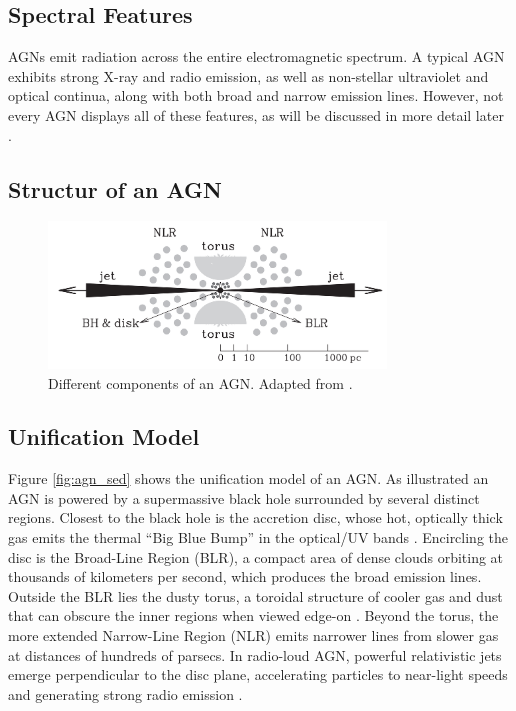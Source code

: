 \subsection{Spectral Features}

AGNs emit radiation across the entire electromagnetic spectrum. A typical AGN exhibits strong X-ray and radio emission, as well as non-stellar ultraviolet and optical continua, along with both broad and narrow emission lines. However, not every AGN displays all of these features, as will be discussed in more detail later \parencite{peterson1997introduction}.

\subsection{Structur of an AGN}

\begin{figure}[!ht]
	\centering
	\includegraphics[width=0.8\textwidth]{pictures/Chapter2/AGN_standard_paradigm.png}
	\caption{Different components of an AGN. Adapted from \textcite{mo2010galaxy}.}
	\label{fig:agn_structure_mo}
\end{figure}


\subsection{Unification Model}
Figure \ref{fig:agn_sed} shows the unification model of an AGN. 
As illustrated an AGN is powered by a supermassive black hole surrounded by several distinct regions. Closest to the black hole is the accretion disc, whose hot, optically thick gas emits the thermal “Big Blue Bump” in the optical/UV bands \parencite{peterson1997introduction}. Encircling the disc is the Broad-Line Region (BLR), a compact area of dense clouds orbiting at thousands of kilometers per second, which produces the broad emission lines. Outside the BLR lies the dusty torus, a toroidal structure of cooler gas and dust that can obscure the inner regions when viewed edge-on \parencite{antonucci1993unified}. Beyond the torus, the more extended Narrow-Line Region (NLR) emits narrower lines from slower gas at distances of hundreds of parsecs. In radio-loud AGN, powerful relativistic jets emerge perpendicular to the disc plane, accelerating particles to near-light speeds and generating strong radio emission \parencite{urry1995unified}.



